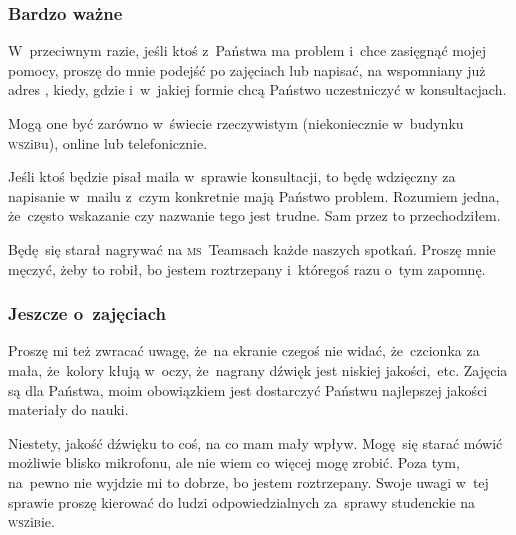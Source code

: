 \documentclass[10pt,t]{beamer}
\begin{document}
\begin{frame}
  \frametitle{Bardzo ważne}


  W~przeciwnym razie, jeśli ktoś z~Państwa ma problem i~chce zasięgnąć
  mojej pomocy, proszę do mnie podejść po zajęciach lub napisać, na
  wspomniany już adres \email, kiedy, gdzie i~w~jakiej formie chcą Państwo
  uczestniczyć w konsultacjach.

  Mogą one być zarówno w~świecie rzeczywistym (niekoniecznie w~budynku
  \textsc{wsz}i\textsc{b}u), online lub telefonicznie.

  Jeśli ktoś będzie pisał maila w~sprawie konsultacji, to będę wdzięczny za
  napisanie w~mailu z~czym konkretnie mają Państwo problem. Rozumiem jedna,
  że~często wskazanie czy nazwanie tego jest trudne. Sam przez to
  przechodziłem.

  Będę~się starał nagrywać na \textsc{ms}~Teamsach każde naszych spotkań.
  Proszę mnie męczyć, żeby to robił, bo jestem roztrzepany i~któregoś
  razu o~tym zapomnę.

\end{frame}





\begin{frame}
  \frametitle{Jeszcze o~zajęciach}






  Proszę mi też zwracać uwagę, że~na ekranie czegoś nie widać,
  że~czcionka za mała, że~kolory kłują w~oczy, że~nagrany dźwięk
  jest niskiej jakości,~etc. Zajęcia są dla Państwa, moim obowiązkiem jest
  dostarczyć Państwu najlepszej jakości materiały do nauki.

  Niestety, jakość dźwięku to coś, na co mam mały wpływ. Mogę~się starać
  mówić możliwie blisko mikrofonu, ale nie wiem co więcej mogę zrobić.
  Poza tym, na~pewno nie wyjdzie mi to dobrze, bo jestem roztrzepany.
  Swoje uwagi w~tej sprawie proszę kierować do ludzi odpowiedzialnych
  za~sprawy studenckie na \textsc{wsz}i\textsc{b}ie.

\end{frame}
\end{document}
